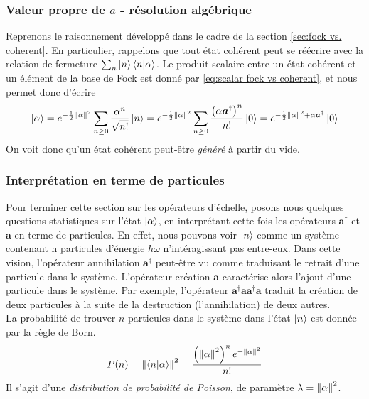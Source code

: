 \documentclass[11pt,oneside,a4paper]{article}
\newcommand{\h}{\ensuremath{\hbar}}
\begin{document}
\subsubsection{Valeur propre de $a$ - résolution algébrique}\label{sec:vp algebrique}
Reprenons le raisonnement développé dans le cadre de la section \ref{sec:fock vs. coherent}. En particulier, rappelons que tout état cohérent peut se réécrire avec la relation de fermeture $\sum_n \ket{n}\braket{n}{\alpha}$. Le produit scalaire entre un état cohérent et un élément de la base de Fock est donné par \eqref{eq:scalar fock vs coherent}, et nous permet donc d'écrire
\begin{align}
  \ket{\alpha} = e^{-\frac{1}{2}\norm{\alpha}^2}\sum_{n\geq 0}\frac{\alpha^n}{\sqrt{n!}}\ket{n} = e^{-\frac{1}{2}\norm{\alpha}^2}\sum_{n\geq 0}\frac{\left(\alpha\bm{a}^\dagger\right)^n}{n!}\ket{0} = e^{-\frac{1}{2}\norm{\alpha}^2+\alpha\bm{a}^\dagger}\ket{0}
\end{align}
On voit donc qu'un état cohérent peut-être \textit{généré} à partir du vide. 
\subsubsection{Interprétation en terme de particules}

Pour terminer cette section sur les opérateurs d'échelle, posons nous quelques questions statistiques sur l'état $\ket{\alpha}$, en interprétant cette fois les opérateurs $\bm{a}^\dagger$ et $\bm{a}$ en terme de particules. En effet, nous pouvons voir $\ket{n}$ comme un système contenant n particules d'énergie $\h\omega$ n'intéragissant pas entre-eux. Dans cette vision, l'opérateur annihilation $\bm{a}^\dagger$ peut-être vu comme traduisant le retrait d'une particule dans le système. L'opérateur création $\bm{a}$ caractérise alors l'ajout d'une particule dans le système. Par exemple, l'opérateur $\bm{a}^\dagger\bm{a}\bm{a}^\dagger\bm{a}$ traduit la création de deux particules à la suite de la destruction (l'annihilation) de deux autres.\\

La probabilité de trouver $n$ particules dans le système dans l'état $\ket{n}$ est donnée par la règle de Born.
\begin{align}
  P(n) = \norm{\braket{n}{\alpha}}^2 = \frac{\left(\norm{\alpha}^{2}\right)^ne^{-\norm{\alpha}^2}}{n!}
\end{align}
Il s'agit d'une \emph{distribution de probabilité de Poisson}, de paramètre $\lambda = \norm{\alpha}^2$.\\
\end{document}
